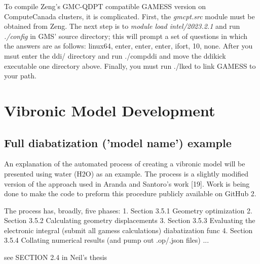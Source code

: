 \documentclass[letterpaper, 12pt, oneside]{report}
\newif\iffinalize
\newif\iffinalize
\begin{document}
    To compile Zeng's GMC-QDPT compatible GAMESS version on ComputeCanada clusters, it is complicated. First, the \textit{gmcpt.src} module must be obtained from Zeng. The next step is to \textit{module load intel/2023.2.1} and run \textit{./config} in GMS' source directory; this will prompt a set of questions in which the answers are as follows: linux64, enter, enter, enter, ifort, 10, none. After you msut enter the ddi/ directory and run ./compddi and move the ddikick executable one directory above. Finally, you must run ./lked to link GAMESS to your path.
\newpage
\else \fi

\iffinalize
\chapter{Vibronic Model Development}
\newpage


\section{Full diabatization ('model name') example} 
An explanation of the automated process of creating a vibronic model will be presented using water (H2O) as an example.
The process is a slightly modified version of the approach used in Aranda and Santoro’s work [19].
Work is being done to make the code to preform this procedure publicly available on GitHub 2.

The process has, broadly, five phases:
1. Section 3.5.1 Geometry optimization
2. Section 3.5.2 Calculating geometry displacements
3. Section 3.5.3 Evaluating the electronic integral (submit all gamess calculations) diabatization func
4. Section 3.5.4 Collating numerical results (and pump out .op/.json files)
...


see SECTION 2.4 in Neil's thesis
\end{document}
